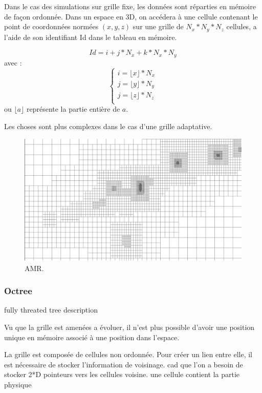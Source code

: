 Dans le cas des simulations sur grille fixe, les données sont réparties en mémoire de façon ordonnée.
Dans un espace en 3D, on accédera à une cellule contenant le point de coordonnées normées $(x,y,z)$ sur une grille de $N_x*N_y*N_z$ cellules, a l'aide de son identifiant Id dans le tableau en mémoire.

\begin{equation}
Id = i + j*N_x + k * N_x*N_y
\end{equation}
avec :
\begin{equation}
\begin{cases}
i=\lfloor x \rfloor *N_x \\
j=\lfloor y \rfloor*N_y \\
j=\lfloor z \rfloor*N_z \\
\end{cases}
\end{equation}
ou $\lfloor a \rfloor$ représente la partie entière de $a$.

Les choses sont plus complexes dans le cas d'une grille adaptative.

\begin{figure}[bth]
        \includegraphics[width=.95\linewidth]{img/02/AMR.pdf} 
        \caption{AMR. 
}
 		\label{fig:AMR}
\end{figure}

\subsubsection{Octree}
fully threated tree description \citep{khokhlov_fully_1998-1}

Vu que la grille est amenées a évoluer, il n'est plus possible d'avoir une position unique en mémoire associé à une position dans l'espace.

La grille est composée de cellules non ordonnée.
Pour créer un lien entre elle, il est nécessaire de stocker l'information de voisinage.
cad que l'on a besoin de stocker 2*D pointeurs vers les cellules voisine.
 une cellule contient la partie physique 

